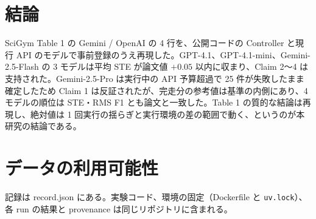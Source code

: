 \documentclass{article}
\providecommand{\airasrecordlink}[1]{#1}
\begin{document}
\section{結論}
\label{sec:conclusion}
SciGym Table 1 の Gemini / OpenAI の 4 行を、公開コードの Controller と現行 API のモデルで事前登録のうえ再現した。GPT-4.1、GPT-4.1-mini、Gemini-2.5-Flash の 3 モデルは平均 STE が論文値 $+0.05$ 以内に収まり、Claim 2〜4 は支持された。Gemini-2.5-Pro は実行中の API 予算超過で 25 件が失敗したまま確定したため Claim 1 は反証されたが、完走分の参考値は基準の内側にあり、4 モデルの順位は STE・RMS F1 とも論文と一致した。Table 1 の質的な結論は再現し、絶対値は 1 回実行の揺らぎと実行環境の差の範囲で動く、というのが本研究の結論である。

\section*{データの利用可能性}
記録は \airasrecordlink{record.json} にある。実験コード、環境の固定（Dockerfile と \texttt{uv.lock}）、各 run の結果と provenance は同じリポジトリに含まれる。



\end{document}
